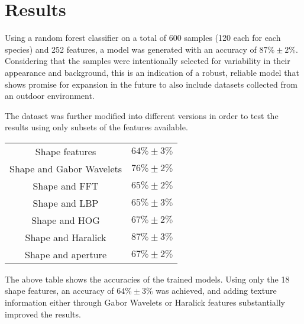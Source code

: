 \section{Results}

Using a random forest classifier on a total of 600 samples (120 each for each species) and 252 features, a model was generated with an accuracy of $87\% \pm 2\%$. Considering that the samples were intentionally selected for variability in their appearance and background, this is an indication of a robust, reliable model that shows promise for expansion in the future to also include datasets collected from an outdoor environment. 

The dataset was further modified into different versions in order to test the results using only subsets of the features available.

\begin{table} 
    \begin{tabular}{ c c }
        Shape features & $64\% \pm 3\%$ \\ 
        Shape and Gabor Wavelets & $76\% \pm 2\%$ \\ 
        Shape and FFT & $65\% \pm 2\%$ \\ 
        Shape and LBP & $65\% \pm 3\%$ \\ 
        Shape and HOG & $67\% \pm 2\%$ \\ 
        Shape and Haralick & $87\% \pm 3\%$ \\ 
        Shape and aperture & $67\% \pm 2\%$ \\ 
    \end{tabular} 
\end{table}

The above table shows the accuracies of the trained models. Using only the 18 shape features, an accuracy of $64\% \pm 3\%$ was achieved, and adding texture information either through Gabor Wavelets or Haralick features substantially improved the results.

  
  
  
  
  
  